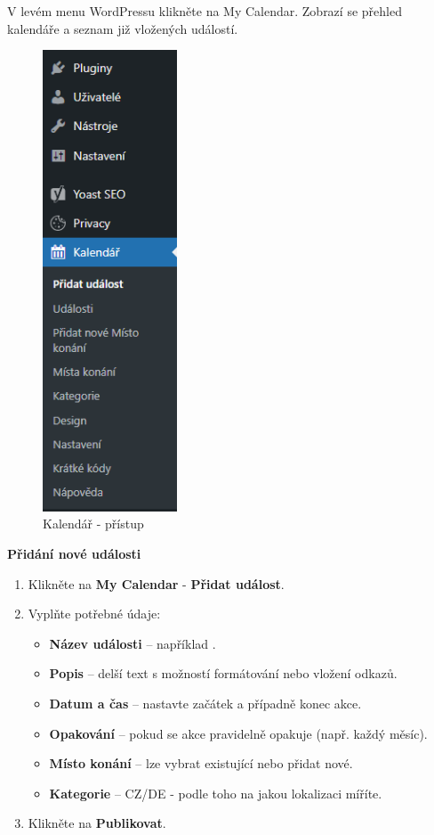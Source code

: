\documentclass[12pt,a4paper]{article}
\begin{document}
	V levém menu WordPressu klikněte na My Calendar. Zobrazí se přehled kalendáře a seznam již vložených událostí.
	
	
	\begin{figure}[htp]
		\centering
		\includegraphics[width=4cm]{WPcalendarmenu.png}
		\caption{Kalendář - přístup}
		\label{fig:role}
	\end{figure}
	
	\textbf{Přidání nové události}

	\begin{enumerate}
		\item Klikněte na \textbf{My Calendar} - \textbf{Přidat událost}.
		\item Vyplňte potřebné údaje:
		\begin{itemize}
			\item \textbf{Název události} – například .
			\item \textbf{Popis} – delší text s možností formátování nebo vložení odkazů.
			\item \textbf{Datum a čas} – nastavte začátek a případně konec akce.
			\item \textbf{Opakování} – pokud se akce pravidelně opakuje (např. každý měsíc).
			\item \textbf{Místo konání} – lze vybrat existující nebo přidat nové.
			\item \textbf{Kategorie} – CZ/DE - podle toho na jakou lokalizaci míříte.
		\end{itemize}
		\item Klikněte na \textbf{Publikovat}.
	\end{enumerate}
	
\end{document}
